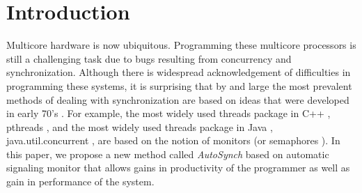 \documentclass[preprint]{sigplanconf}
\begin{document}
\section{Introduction} \label{sec:intro}





Multicore hardware is now ubiquitous. Programming these multicore processors is
still a challenging task due to
bugs resulting from concurrency and synchronization.
Although there is widespread acknowledgement of difficulties 
in programming these systems, it is surprising that by and large the most 
prevalent methods of dealing with synchronization are based on ideas that were 
developed in early 70's \cite{dijk68, hoa74, bh75a}. For 
example, the most widely used threads package in C++ \cite{stro97}, 
pthreads \cite{bute97}, and the most widely used threads package in Java \cite{gjs00}, 
java.util.concurrent \cite{lea05}, are based
on the notion of monitors \cite{hoa74, bh75a}(or semaphores 
\cite{dijk65, dijk68}). 
In this paper, we propose a new method called {\em AutoSynch} based on
automatic signaling monitor 
that allows gains in productivity of the programmer as well as gain in
performance of the system.
\end{document}
